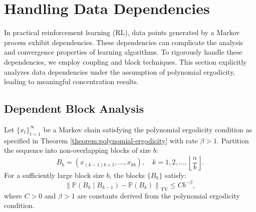 \section{Handling Data Dependencies}
\label{sec:handling-data-dependencies}

In practical reinforcement learning (RL), data points generated by a Markov process exhibit dependencies. These dependencies can complicate the analysis and convergence properties of learning algorithms. To rigorously handle these dependencies, we employ coupling and block techniques. This section explicitly analyzes data dependencies under the assumption of polynomial ergodicity, leading to meaningful concentration results.





\subsection{Dependent Block Analysis}

\begin{lemma}
\label{lemma:dependent-blocks}
Let \(\{x_t\}_{t=1}^\infty\) be a Markov chain satisfying the polynomial ergodicity condition as specified in Theorem \ref{theorem:polynomial-ergodicity} with rate \(\beta > 1\). Partition the sequence into non-overlapping blocks of size \(b\):
\[
B_k = (x_{(k-1)b + 1}, \ldots, x_{kb}), \quad k = 1, 2, \ldots, \left\lfloor \frac{n}{b} \right\rfloor.
\]
For a sufficiently large block size \(b\), the blocks \(\{B_k\}\) satisfy:
\[
\left\| \mathbb{P}(B_k \mid B_{k-1}) - \mathbb{P}(B_k) \right\|_{\text{TV}} \leq C b^{-\beta},
\]
where \(C > 0\) and \(\beta > 1\) are constants derived from the polynomial ergodicity condition.
\end{lemma}

